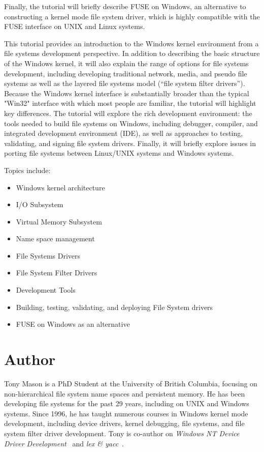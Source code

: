 \documentclass[letter,11pt]{article}
\begin{document}
Finally, the tutorial will briefly describe FUSE on Windows, an alternative to constructing a kernel mode file system driver, which is highly compatible with the FUSE interface on UNIX and Linux systems.

This tutorial provides an introduction to the Windows kernel environment from a file systems development perspective.  In addition to describing the basic structure of the Windows kernel, it will also explain the range of options for file systems development, including developing traditional network, media, and pseudo file systems as well as the layered file systems model (``file system filter drivers'').  Because the Windows kernel interface is substantially broader than the typical "Win32" interface with which most people are familiar, the tutorial will highlight key differences.  The tutorial will explore the rich development environment: the tools needed to build file systems on Windows, including debugger, compiler, and integrated development environment (IDE), as well as approaches to testing, validating, and signing file system drivers. Finally, it will briefly explore issues in porting file systems between Linux/UNIX systems and Windows systems.

\vspace{0.2cm}

Topics include:

\begin{itemize}

\item Windows kernel architecture
\item I/O Subsystem
\item Virtual Memory Subsystem
\item Name space management
\item File Systems Drivers
\item File System Filter Drivers
\item Development Tools
\item Building, testing, validating, and deploying File System drivers
\item FUSE on Windows as an alternative
\end{itemize}


\section*{Author}

Tony Mason is a PhD Student at the University of British Columbia, focusing on non-hierarchical file system name spaces and persistent memory.  He has been developing file systems for the past 29 years, including on UNIX and Windows systems.  Since 1996, he has taught numerous courses in Windows kernel mode development, including device drivers, kernel debugging, file systems, and file system filter driver development.  Tony is co-author on \textit{Windows NT Device Driver Development}~\cite{viscarola1998windows} and \textit{lex \& yacc}~\cite{levine1992lex}.

\printbibliography[title={Bibliography}]
\end{document}
